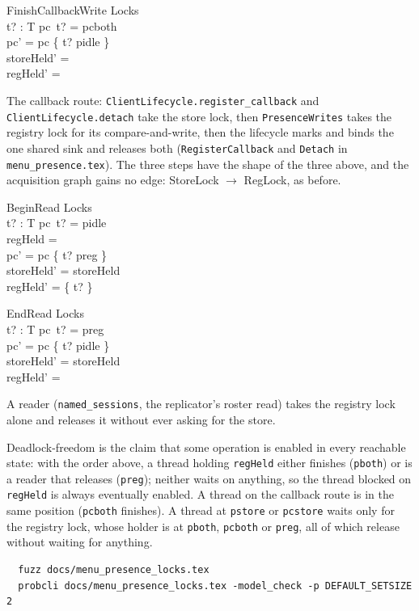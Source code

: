 \documentclass[a4paper,10pt,fleqn]{article}
\begin{document}
\begin{schema}{FinishCallbackWrite}
  \Delta Locks \\
  t? : T
\where
  pc~t? = pcboth \\
  pc' = pc \oplus \{ t? \mapsto pidle \} \\
  storeHeld' = \emptyset \\
  regHeld' = \emptyset
\end{schema}

The callback route: \texttt{ClientLifecycle.register\_callback} and
\texttt{ClientLifecycle.detach} take the store lock, then
\texttt{PresenceWrites} takes the registry lock for its compare-and-write, then
the lifecycle marks and binds the one shared sink and releases both
(\texttt{RegisterCallback} and \texttt{Detach} in \texttt{menu\_presence.tex}).
The three steps have the shape of the three above, and the acquisition graph
gains no edge: StoreLock $\to$ RegLock, as before.

\begin{schema}{BeginRead}
  \Delta Locks \\
  t? : T
\where
  pc~t? = pidle \\
  regHeld = \emptyset \\
  pc' = pc \oplus \{ t? \mapsto preg \} \\
  storeHeld' = storeHeld \\
  regHeld' = \{ t? \}
\end{schema}

\begin{schema}{EndRead}
  \Delta Locks \\
  t? : T
\where
  pc~t? = preg \\
  pc' = pc \oplus \{ t? \mapsto pidle \} \\
  storeHeld' = storeHeld \\
  regHeld' = \emptyset
\end{schema}

A reader (\texttt{named\_sessions}, the replicator's roster read) takes the
registry lock alone and releases it without ever asking for the store.

Deadlock-freedom is the claim that some operation is enabled in every
reachable state: with the order above, a thread holding \texttt{regHeld}
either finishes (\texttt{pboth}) or is a reader that releases
(\texttt{preg}); neither waits on anything, so the thread blocked on
\texttt{regHeld} is always eventually enabled. A thread on the callback
route is in the same position (\texttt{pcboth} finishes). A thread at
\texttt{pstore} or \texttt{pcstore} waits only for the registry lock, whose
holder is at \texttt{pboth}, \texttt{pcboth} or \texttt{preg}, all of which
release without waiting for anything.

\begin{verbatim}
  fuzz docs/menu_presence_locks.tex
  probcli docs/menu_presence_locks.tex -model_check -p DEFAULT_SETSIZE 2
\end{verbatim}
\end{document}
